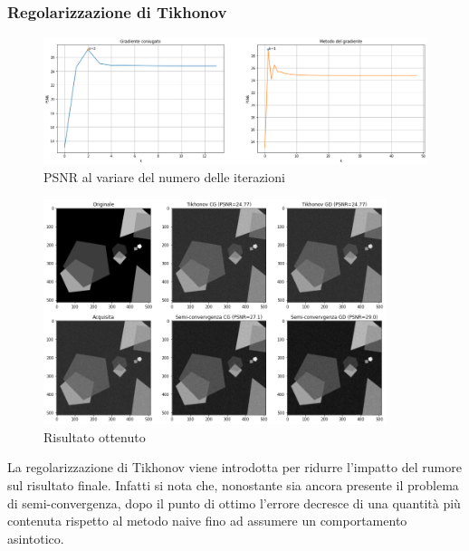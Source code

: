 \documentclass[11pt]{article}
\begin{document}
\subsubsection{Regolarizzazione di Tikhonov}
\begin{figure}[H]
    \centering
    \includegraphics[width=15cm]{semiconvergenza/1/psnr_tikhonov.png}
    \caption{PSNR al variare del numero delle iterazioni}
    \label{fig:semiconv_psnr_tikhonov1}
\end{figure}
\begin{figure}[H]
    \centering
    \includegraphics[width=10cm]{semiconvergenza/1/deblur_tikhonov.png}
    \caption{Risultato ottenuto}
    \label{fig:semiconv_deblur_tikhonov1}
\end{figure}
La regolarizzazione di Tikhonov viene introdotta per ridurre l'impatto del rumore sul risultato finale. 
Infatti si nota che, nonostante sia ancora presente il problema di semi-convergenza, dopo il punto di ottimo l'errore decresce di una quantità più contenuta rispetto al metodo naive fino ad assumere un comportamento asintotico.
\end{document}
